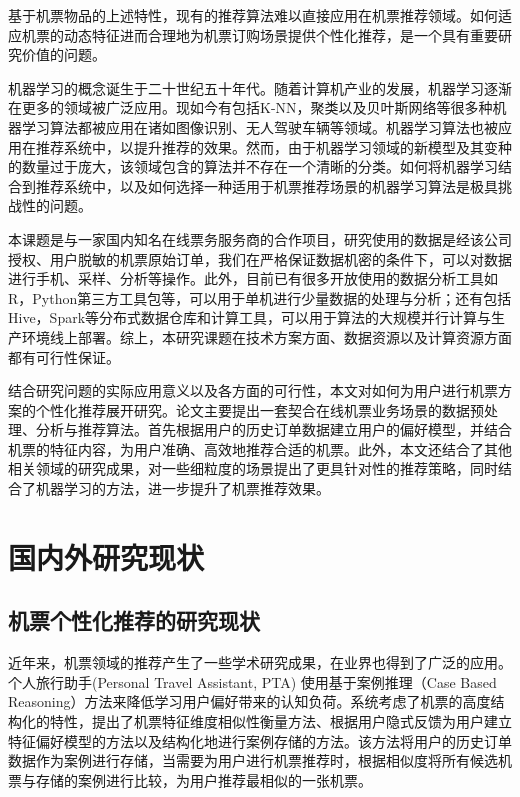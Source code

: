 基于机票物品的上述特性，现有的推荐算法难以直接应用在机票推荐领域。如何适应机票的动态特征进而合理地为机票订购场景提供个性化推荐，是一个具有重要研究价值的问题。

机器学习的概念诞生于二十世纪五十年代\cite{portugal2015use}。随着计算机产业的发展，机器学习逐渐在更多的领域被广泛应用。现如今有包括K-NN，聚类以及贝叶斯网络等很多种机器学习算法都被应用在诸如图像识别、无人驾驶车辆等领域。机器学习算法也被应用在推荐系统中，以提升推荐的效果。然而，由于机器学习领域的新模型及其变种的数量过于庞大，该领域包含的算法并不存在一个清晰的分类。如何将机器学习结合到推荐系统中，以及如何选择一种适用于机票推荐场景的机器学习算法是极具挑战性的问题。

本课题是与一家国内知名在线票务服务商的合作项目，研究使用的数据是经该公司授权、用户脱敏的机票原始订单，我们在严格保证数据机密的条件下，可以对数据进行手机、采样、分析等操作。此外，目前已有很多开放使用的数据分析工具如R，Python第三方工具包等，可以用于单机进行少量数据的处理与分析；还有包括Hive，Spark等分布式数据仓库和计算工具，可以用于算法的大规模并行计算与生产环境线上部署。综上，本研究课题在技术方案方面、数据资源以及计算资源方面都有可行性保证。

结合研究问题的实际应用意义以及各方面的可行性，本文对如何为用户进行机票方案的个性化推荐展开研究。论文主要提出一套契合在线机票业务场景的数据预处理、分析与推荐算法。首先根据用户的历史订单数据建立用户的偏好模型，并结合机票的特征内容，为用户准确、高效地推荐合适的机票。此外，本文还结合了其他相关领域的研究成果，对一些细粒度的场景提出了更具针对性的推荐策略，同时结合了机器学习的方法，进一步提升了机票推荐效果。

\section{国内外研究现状}
\subsection{机票个性化推荐的研究现状}
近年来，机票领域的推荐产生了一些学术研究成果，在业界也得到了广泛的应用。个人旅行助手(Personal Travel Assistant, PTA)\cite{coyle2004making} 使用基于案例推理（Case Based Reasoning）\cite{richter2013case,kolodner2014case}方法来降低学习用户偏好带来的认知负荷。系统考虑了机票的高度结构化的特性，提出了机票特征维度相似性衡量方法、根据用户隐式反馈为用户建立特征偏好模型的方法以及结构化地进行案例存储的方法。该方法将用户的历史订单数据作为案例进行存储，当需要为用户进行机票推荐时，根据相似度将所有候选机票与存储的案例进行比较，为用户推荐最相似的一张机票。

